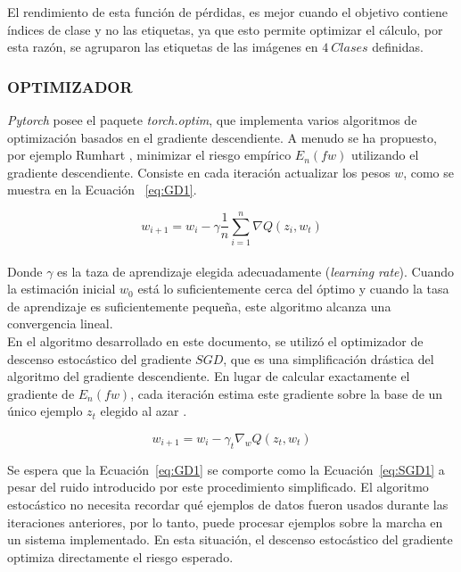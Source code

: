 El rendimiento de esta función de pérdidas, es mejor cuando el objetivo contiene índices de clase y no las etiquetas, ya que esto permite optimizar el cálculo, por esta razón, se agruparon las etiquetas de las imágenes en $4 \ Clases$ definidas.

\subsubsection{OPTIMIZADOR}

\textit{Pytorch} posee el paquete \textit{torch.optim}, que implementa varios algoritmos de optimización basados en el gradiente descendiente. A menudo se ha propuesto, por ejemplo Rumhart \cite{rumelhart1986learning}, minimizar el riesgo empírico $E_n(fw)$ utilizando el gradiente descendiente. Consiste en cada iteración actualizar los pesos $w$, como se muestra en la Ecuación ~\ref{eq:GD1}.


\begin{equation}
	\label{eq:GD1}
	{w_{i+1}=w_i-\gamma\frac{1}{n}\sum_{i=1}^{n}\nabla Q(z_i,w_t)}
\end{equation}\\

	Donde $\gamma$ es la taza de aprendizaje elegida adecuadamente (\textit{learning rate}). Cuando la estimación inicial $w_0$ está lo suficientemente cerca del óptimo y cuando la tasa de aprendizaje es suficientemente pequeña, este algoritmo alcanza una convergencia lineal.\\
	
	
	En el algoritmo desarrollado en este documento, se utilizó el optimizador de descenso estocástico del gradiente $SGD$, que es una simplificación drástica del algoritmo del gradiente descendiente. En lugar de calcular exactamente el gradiente de $E_n(fw)$, cada iteración estima este gradiente sobre la base de un único ejemplo $z_t$ elegido al azar \cite{bottou2012stochastic}.

\begin{equation}
	\label{eq:SGD1}
	{w_{i+1}=w_i-\gamma_t\nabla_w Q(z_t,w_t)}
\end{equation}

Se espera que la Ecuación~\ref{eq:GD1} se comporte como la Ecuación~\ref{eq:SGD1} a pesar del ruido introducido por este procedimiento simplificado. El algoritmo estocástico no necesita recordar qué ejemplos de datos fueron usados durante las iteraciones anteriores, por lo tanto, puede procesar ejemplos sobre la marcha en un sistema implementado. En esta situación, el descenso estocástico del gradiente optimiza directamente el riesgo esperado.	

